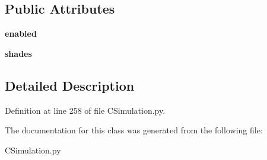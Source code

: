 \subsection*{Public Attributes}
\begin{DoxyCompactItemize}
\item 
\mbox{\label{class_c_simulation_1_1_simulation_1_1_no_m_a_s_s_models_1_1_shades_a91b39549c797bd5646357c8b6eecad0f}} 
{\bfseries enabled}
\item 
\mbox{\label{class_c_simulation_1_1_simulation_1_1_no_m_a_s_s_models_1_1_shades_a96ff58a0d53420486f2da9f07122e085}} 
{\bfseries shades}
\end{DoxyCompactItemize}


\subsection{Detailed Description}


Definition at line 258 of file C\+Simulation.\+py.



The documentation for this class was generated from the following file\+:\begin{DoxyCompactItemize}
\item 
C\+Simulation.\+py\end{DoxyCompactItemize}
